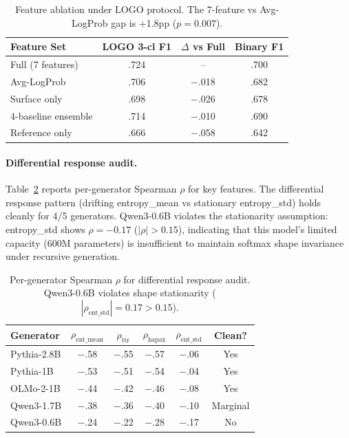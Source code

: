 \documentclass[11pt,a4paper]{article}
\begin{document}
\begin{table}[t]
\centering
\small
\begin{tabular}{lccc}
\toprule
Feature Set & LOGO 3-cl F1 & $\Delta$ vs Full & Binary F1 \\
\midrule
Full (7 features) & .724 & -- & .700 \\
Avg-LogProb & .706 & $-$.018 & .682 \\
Surface only & .698 & $-$.026 & .678 \\
4-baseline ensemble & .714 & $-$.010 & .690 \\
Reference only & .666 & $-$.058 & .642 \\
\bottomrule
\end{tabular}
\caption{Feature ablation under LOGO protocol. The 7-feature vs Avg-LogProb gap is +1.8pp ($p{=}0.007$).}
\label{tab:logo_ablation}
\end{table}

\paragraph{Differential response audit.} Table~\ref{tab:diffresponse} reports per-generator Spearman $\rho$ for key features. The differential response pattern (drifting entropy\_mean vs stationary entropy\_std) holds cleanly for 4/5 generators. Qwen3-0.6B violates the stationarity assumption: entropy\_std shows $\rho{=}{-}0.17$ ($|\rho|{>}0.15$), indicating that this model's limited capacity (600M parameters) is insufficient to maintain softmax shape invariance under recursive generation.

\begin{table}[t]
\centering
\small
\begin{tabular}{lccccc}
\toprule
Generator & $\rho_{\text{ent\_mean}}$ & $\rho_{\text{ttr}}$ & $\rho_{\text{hapax}}$ & $\rho_{\text{ent\_std}}$ & Clean? \\
\midrule
Pythia-2.8B & $-$.58 & $-$.55 & $-$.57 & $-$.06 & Yes \\
Pythia-1B & $-$.53 & $-$.51 & $-$.54 & $-$.04 & Yes \\
OLMo-2-1B & $-$.44 & $-$.42 & $-$.46 & $-$.08 & Yes \\
Qwen3-1.7B & $-$.38 & $-$.36 & $-$.40 & $-$.10 & Marginal \\
Qwen3-0.6B & $-$.24 & $-$.22 & $-$.28 & $-$.17 & No \\
\bottomrule
\end{tabular}
\caption{Per-generator Spearman $\rho$ for differential response audit. Qwen3-0.6B violates shape stationarity ($|\rho_{\text{ent\_std}}|{=}0.17{>}0.15$).}
\label{tab:diffresponse}
\end{table}
\end{document}
